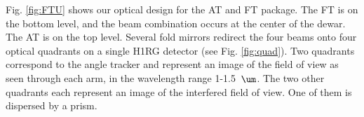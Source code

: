 Fig. \ref{fig:FTU} shows our optical design for the AT and FT package. The FT is on the bottom level, and the beam combination occurs at the center of the dewar. The AT is on the top level. Several fold mirrors redirect the four beams onto four optical quadrants on a single H1RG detector (see Fig. \ref{fig:quad}). Two quadrants correspond to the angle tracker and represent an image of the field of view as seen through each arm, in the wavelength range 1-1.5~$\um$. The two other quadrants each represent an image of the interfered field of view. One of them is dispersed by a prism.





